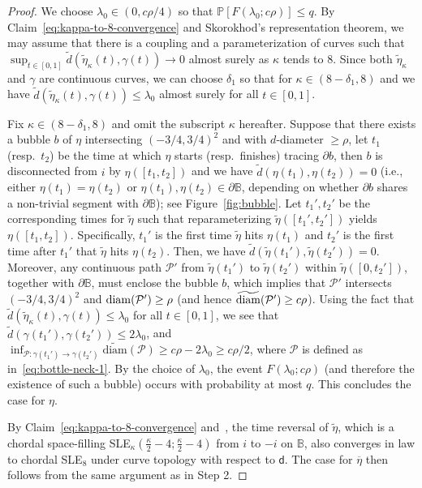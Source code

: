 \documentclass[a4paper]{article}
\numberwithin{equation}{section}
\numberwithin{equation}{section}
\renewcommand{\1}{\mathbf{1}}
\begin{document}
\begin{proof}
    We choose $\lambda_0 \in (0,c\rho/4)$ so that $\mathbb P[F(\lambda_0;c\rho)] \leq q$. By Claim~\eqref{eq:kappa-to-8-convergence} and Skorokhod's representation theorem, we may assume that there is a coupling and a parameterization of curves such that $\sup_{t \in [0,1]} \widetilde d(\widetilde \eta_\kappa(t),\gamma(t)) \to 0$ almost surely as $\kappa$ tends to 8. Since both $\widetilde \eta_\kappa$ and $\gamma$ are continuous curves, we can choose $\delta_1$ so that for $\kappa \in (8-\delta_1,8)$ and we have $\widetilde d(\widetilde \eta_\kappa(t),\gamma(t)) \leq \lambda_0$ almost surely for all $t \in [0,1]$.

    Fix $\kappa \in (8-\delta_1,8)$ and omit the subscript $\kappa$ hereafter. Suppose that there exists a bubble $b$ of $\eta$ intersecting $(-3/4,3/4)^2$ and with $d$-diameter $\geq \rho$, let $t_1$ (resp.\ $t_2$) be the time at which $\eta$ starts (resp.\ finishes) tracing $\partial b$, then $b$ is disconnected from $i$ by $\eta([t_1,t_2])$ and we have $\widetilde d(\eta(t_1),\eta(t_2))=0$ (i.e., either $\eta(t_1)=\eta(t_2)$ or $\eta(t_1),\eta(t_2) \in \partial \mathbb B$, depending on whether $\partial b$ shares a non-trivial segment with $\partial \mathbb B$); see Figure~\ref{fig:bubble}. Let $t_1',t_2'$ be the corresponding times for $\widetilde \eta$ such that reparameterizing $\widetilde \eta([t_1',t_2'])$ yields $\eta([t_1,t_2])$. Specifically, $t_1'$ is the first time $\widetilde \eta$ hits $\eta(t_1)$ and $t_2'$ is the first time after $t_1'$ that $\widetilde \eta$ hits $\eta(t_2)$. Then, we have $\widetilde d(\widetilde \eta (t_1'),\widetilde \eta(t_2'))=0$. Moreover, any continuous path $\mathcal{P}'$ from $\widetilde \eta (t_1')$ to $\widetilde \eta (t_2')$ within $\widetilde \eta ([0, t_2'])$, together with $\partial \mathbb B$, must enclose the bubble $b$, which implies that $\mathcal{P}'$ intersects $(-3/4,3/4)^2$ and ${\rm diam}(\mathcal{P}') \geq \rho$ (and hence $\widetilde{{\rm diam}}(\mathcal{P}') \geq c \rho$). Using the fact that $\widetilde d(\widetilde \eta_\kappa(t),\gamma(t)) \leq \lambda_0$ for all $t \in [0,1]$, we see that $\widetilde d(\gamma(t_1'),\gamma(t_2')) \le 2\lambda_0$, and $\inf_{\mathcal P:\gamma(t_1') \to \gamma(t_2')} \widetilde{\mathrm{diam}}(\mathcal P) \ge c\rho - 2 \lambda_0 \geq c \rho/2$, where $\mathcal P$ is defined as in~\eqref{eq:bottle-neck-1}. By the choice of $\lambda_0$, the event $F(\lambda_0;c\rho)$ (and therefore the existence of such a bubble) occurs with probability at most $q$. This concludes the case for $\eta$.

    By Claim~\eqref{eq:kappa-to-8-convergence} and~\cite[Theorem 1.19]{IG4}, the time reversal of $\widetilde \eta$, which is a chordal space-filling SLE$_\kappa(\frac{\kappa}{2}-4;\frac{\kappa}{2}-4)$ from $i$ to $-i$ on $\mathbb B$, also converges in law to chordal SLE$_8$ under curve topology with respect to $\mathsf d$. The case for $\overline\eta$ then follows from the same argument as in Step 2.
\end{proof}
\end{document}
